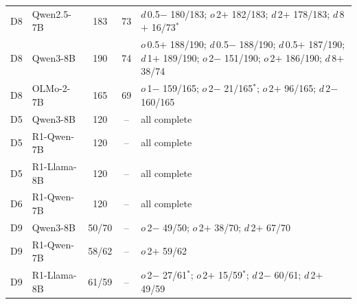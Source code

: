 \documentclass[11pt]{article}
\begin{document}
\begin{table}[H]
\begin{tabularx}{\linewidth}{@{}l l c c X@{}}
D8 & Qwen2.5-7B & 183 & 73 & $d$\,0.5$-$ 180/183; $o$\,2$+$ 182/183; $d$\,2$+$ 178/183; $d$\,8$+$ 16/73$^\ast$ \\
D8 & Qwen3-8B & 190 & 74 & $o$\,0.5$+$ 188/190; $d$\,0.5$-$ 188/190; $d$\,0.5$+$ 187/190; $d$\,1$+$ 189/190; $o$\,2$-$ 151/190; $o$\,2$+$ 186/190; $d$\,8$+$ 38/74 \\
D8 & OLMo-2-7B & 165 & 69 & $o$\,1$-$ 159/165; $o$\,2$-$ 21/165$^\ast$; $o$\,2$+$ 96/165; $d$\,2$-$ 160/165 \\
D5 & Qwen3-8B & 120 & -- & all complete \\
D5 & R1-Qwen-7B & 120 & -- & all complete \\
D5 & R1-Llama-8B & 120 & -- & all complete \\
D6 & R1-Qwen-7B & 120 & -- & all complete \\
D9 & Qwen3-8B & 50/70 & -- & $o$\,2$-$ 49/50; $o$\,2$+$ 38/70; $d$\,2$+$ 67/70 \\
D9 & R1-Qwen-7B & 58/62 & -- & $o$\,2$+$ 59/62 \\
D9 & R1-Llama-8B & 61/59 & -- & $o$\,2$-$ 27/61$^\ast$; $o$\,2$+$ 15/59$^\ast$; $d$\,2$-$ 60/61; $d$\,2$+$ 49/59 \\
\bottomrule
\end{tabularx}
\end{table}
\end{document}
